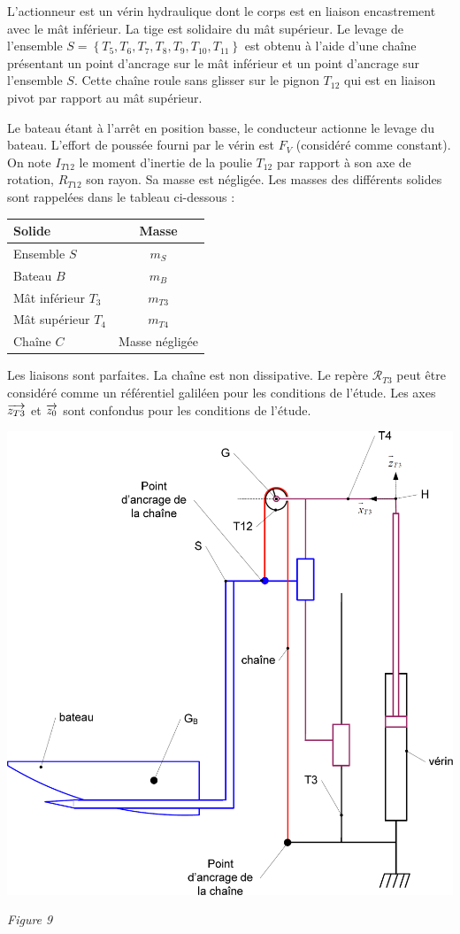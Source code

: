 \documentclass[10pt,fleqn]{article} %
\begin{document}
L’actionneur est un vérin hydraulique dont le corps est en liaison encastrement avec le mât inférieur. La tige est solidaire du mât supérieur. Le levage de l’ensemble $S=\left\{T_5,T_6,T_7,T_8,T_9,T_{10},T_{11}\right\}$ est obtenu à l’aide d’une chaîne présentant un point d’ancrage sur le mât inférieur et un point d’ancrage sur l’ensemble $S$. Cette chaîne roule sans glisser sur le pignon $T_{12}$ qui est en liaison pivot par rapport au mât supérieur.

Le bateau étant à l’arrêt en position basse, le conducteur actionne le levage du bateau.
L’effort de poussée fourni par le vérin est $F_V$ (considéré comme constant). 
On note $I_{T12}$ le moment d’inertie de la poulie $T_{12}$ par rapport à son axe de rotation, $R_{T12}$ son rayon. Sa masse est négligée.
Les masses des différents solides sont rappelées dans le tableau ci-dessous :
\begin{center}
\begin{tabular}{|l|c|}
\hline 
Solide & Masse \\ \hline
Ensemble $S$ & $m_S$ \\ \hline
 Bateau $B$ & $m_B$ \\ \hline
 Mât inférieur $T_3$ & $m_{T3}$ \\ \hline
 Mât supérieur $T_4$ & $m_{T4}$ \\ \hline
 Chaîne $C$ & Masse négligée \\ \hline
\end{tabular}
\end{center}

Les liaisons sont parfaites. La chaîne est non dissipative. Le repère $\mathcal{R}_{T3}$ peut être considéré comme un référentiel galiléen pour les conditions de l’étude. Les axes $\overrightarrow{z_{T3}}$ et  $\overrightarrow{z_{0}}$ sont confondus pour les conditions de l’étude.

\begin{center}
\includegraphics[width=.65\linewidth]{images/fig_09}

\textit{Figure 9}
\end{center}
\end{document}

